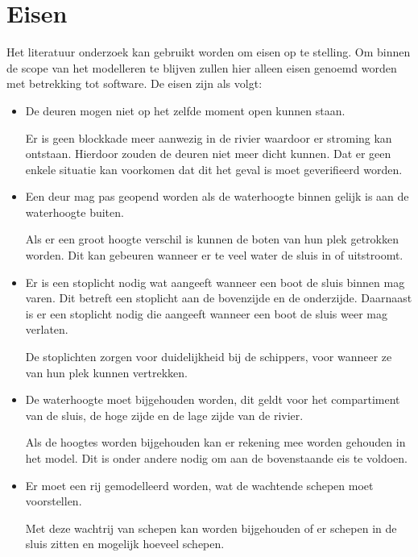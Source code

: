 \documentclass{article}
\begin{document}
\section{Eisen} %
Het literatuur onderzoek kan gebruikt worden om eisen op te stelling. Om binnen de scope van het modelleren te blijven zullen hier alleen eisen genoemd worden met betrekking tot software. De eisen zijn als volgt:
\begin{itemize}

\item De deuren mogen niet op het zelfde moment open kunnen staan.

Er is geen blockkade meer aanwezig in de rivier waardoor er stroming kan ontstaan. Hierdoor zouden de deuren niet meer dicht kunnen.
Dat er geen enkele situatie kan voorkomen dat dit het geval is moet geverifieerd worden.

\item Een deur mag pas geopend worden als de waterhoogte binnen gelijk is aan de waterhoogte buiten.

Als er een groot hoogte verschil is kunnen de boten van hun plek getrokken worden. Dit kan gebeuren wanneer er te veel water de sluis in of uitstroomt.

\item Er is een stoplicht nodig wat aangeeft wanneer een boot de sluis binnen mag varen. Dit betreft een stoplicht aan de bovenzijde en de onderzijde. Daarnaast is er een stoplicht nodig die aangeeft wanneer een boot de sluis weer mag verlaten.


De stoplichten zorgen voor duidelijkheid bij de schippers, voor wanneer ze van hun plek kunnen vertrekken.

\item De waterhoogte moet bijgehouden worden, dit geldt voor het compartiment van de sluis, de hoge zijde en de lage zijde van de rivier.

Als de hoogtes worden bijgehouden kan er rekening mee worden gehouden in het model. Dit is onder andere nodig om aan de bovenstaande eis te voldoen.

\item Er moet een rij gemodelleerd worden, wat de wachtende schepen moet voorstellen.

Met deze wachtrij van schepen kan worden bijgehouden of er schepen in de sluis zitten en mogelijk hoeveel schepen.

\end{itemize}
\end{document}
